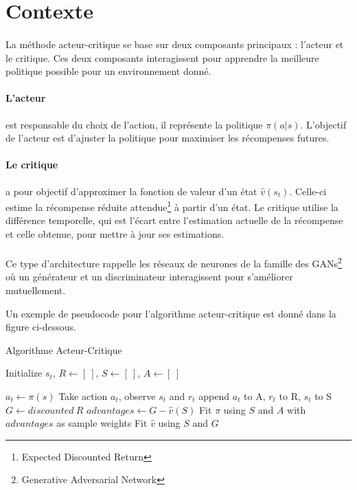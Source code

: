 \section{Contexte}

\paragraph{}
La méthode acteur-critique se base sur deux composants principaux : l'acteur et le critique. 
Ces deux composants interagissent pour apprendre la meilleure politique possible pour un environnement donné.

\paragraph{L'acteur} est responsable du choix de l'action, il représente la politique $\pi(a|s)$. 
L'objectif de l'acteur est d'ajuster la politique pour maximiser les récompenses futures.

\paragraph{Le critique} a pour objectif d'approximer la fonction de valeur d'un état $\hat{v}(s_t)$. 
Celle-ci estime la récompense réduite attendue\footnote{Expected Discounted Return} à partir d'un état.
Le critique utilise la différence temporelle, 
qui est l'écart entre l'estimation actuelle de la récompense et celle obtenue, pour mettre à jour ses estimations.

\paragraph{}
Ce type d'architecture rappelle les réseaux de neurones de la famille des GANs\footnote{Generative Adversarial Network} 
où un générateur et un discriminateur interagissent pour s'améliorer mutuellement.


Un exemple de pseudocode pour l'algorithme acteur-critique est donné dans la figure ci-dessous.
\begin{algorithm}
\caption{Algorithme Acteur-Critique}\label{alg:a2c}
\begin{algorithmic}

\State Initialize $s_t$, $R \gets [~]$, $S \gets [~]$, $A \gets [~]$

\State $a_t \gets \pi(s)$ 
\State Take action $a_t$, observe $s_t$ and $r_t$
\State append $a_t$ to A, $r_t$ to R, $s_t$ to S
\State $G \gets discounted~R$
\State $advantages \gets G - \hat{v}(S)$
\State Fit $\pi$ using \(S\) and \(A\) with $advantages$ as sample weights
\State Fit $\hat{v}$ using \(S\) and \(G\)
\EndIf
\EndFor
\EndFor
\end{algorithmic}
\end{algorithm}

